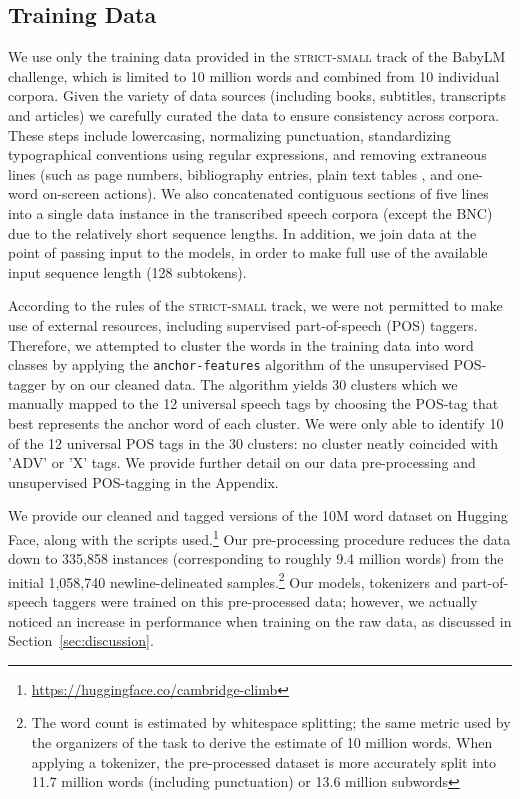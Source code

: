 \subsection{Training Data}
\label{subsec:data}
We use only the training data provided in the \textsc{strict-small} track of the BabyLM challenge, which is limited to 10 million words and combined from 10 individual corpora. Given the variety of data sources (including books, subtitles, transcripts and articles) we carefully curated the data to ensure consistency across corpora. These steps include lowercasing, normalizing punctuation, standardizing typographical conventions using regular expressions, and removing extraneous lines (such as page numbers, bibliography entries, plain text tables , and one-word on-screen actions). We also concatenated contiguous sections of five lines into a single data instance in the transcribed speech corpora (except the BNC) due to the relatively short sequence lengths. In addition, we join data at the point of passing input to the models, in order to make full use of the available input sequence length (128 subtokens).
 
According to the rules of the \textsc{strict-small} track, we were not permitted to make use of external resources, including supervised part-of-speech (POS) taggers. Therefore, we attempted to cluster the words in the training data into word classes by applying the \texttt{anchor-features} algorithm of the unsupervised POS-tagger by \citet{stratos2016unsupervisedpos} on our cleaned data. The algorithm yields 30 clusters which we manually mapped to the 12 universal speech tags \citep{petrov2012universalpos} by choosing the POS-tag that best represents the anchor word of each cluster. We were only able to identify 10 of the 12 universal POS tags in the 30 clusters: no cluster neatly coincided with 'ADV' or 'X' tags. We provide further detail on our data pre-processing and unsupervised POS-tagging in the Appendix.

We provide our cleaned and tagged versions of the 10M word dataset on Hugging Face, along with the scripts used.\footnote{\url{https://huggingface.co/cambridge-climb}} Our pre-processing procedure reduces the data down to 335,858 instances (corresponding to roughly 9.4 million words) from the initial 1,058,740 newline-delineated samples.\footnote{The word count is estimated by whitespace splitting; the same metric used by the organizers of the task to derive the estimate of 10 million words. When applying a tokenizer, the pre-processed dataset is more accurately split into 11.7 million words (including punctuation) or 13.6 million subwords} Our models, tokenizers and part-of-speech taggers were trained on this pre-processed data; however, we actually noticed an increase in performance when training on the raw data, as discussed in Section~\ref{sec:discussion}.

